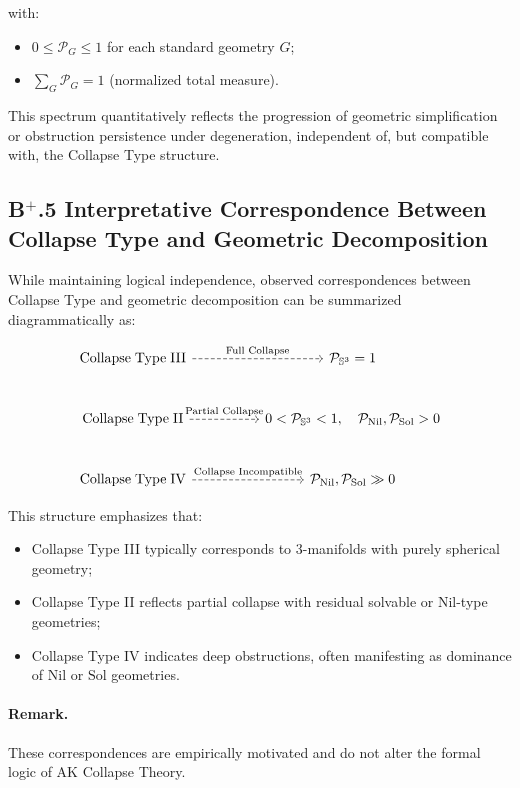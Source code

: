 \documentclass[11pt]{article}
\begin{document}
with:

\begin{itemize}
    \item $0 \leq \mathcal{P}_G \leq 1$ for each standard geometry $G$;
    \item $\sum_G \mathcal{P}_G = 1$ (normalized total measure).
\end{itemize}

This spectrum quantitatively reflects the progression of geometric simplification or obstruction persistence under degeneration, independent of, but compatible with, the Collapse Type structure.

\subsection*{B$^{+}$.5 Interpretative Correspondence Between Collapse Type and Geometric Decomposition}

While maintaining logical independence, observed correspondences between Collapse Type and geometric decomposition can be summarized diagrammatically as:

\[
\begin{tikzcd}[column sep=huge, row sep=large]
\mathrm{Collapse\;Type\;III} \arrow[r, dashed, "\text{Full Collapse}"]
& \mathcal{P}_{\mathbb{S}^3} = 1 \\
\mathrm{Collapse\;Type\;II} \arrow[r, dashed, "\text{Partial Collapse}"]
& 0 < \mathcal{P}_{\mathbb{S}^3} < 1,\quad \mathcal{P}_{\mathrm{Nil}},\mathcal{P}_{\mathrm{Sol}} > 0 \\
\mathrm{Collapse\;Type\;IV} \arrow[r, dashed, "\text{Collapse Incompatible}"]
& \mathcal{P}_{\mathrm{Nil}},\mathcal{P}_{\mathrm{Sol}} \gg 0
\end{tikzcd}
\]

This structure emphasizes that:

\begin{itemize}
    \item Collapse Type III typically corresponds to $3$-manifolds with purely spherical geometry;
    \item Collapse Type II reflects partial collapse with residual solvable or Nil-type geometries;
    \item Collapse Type IV indicates deep obstructions, often manifesting as dominance of $\mathrm{Nil}$ or $\mathrm{Sol}$ geometries.
\end{itemize}

\paragraph{Remark.} These correspondences are empirically motivated and do not alter the formal logic of AK Collapse Theory.
\end{document}
